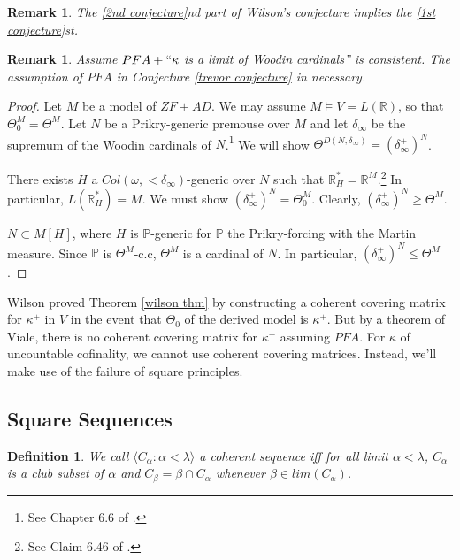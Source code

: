 \documentclass[12pt]{article}
\newtheorem{definition}[theorem]{Definition}
\newtheorem{remark}[theorem]{Remark}
\newcommand\R{\mathbb{R}}
\renewcommand\P{\mathbb{P}}
\begin{document}
\begin{remark}
    The \ref{2nd conjecture}nd part of Wilson's conjecture implies the \ref{1st conjecture}st.
\end{remark}

\begin{remark}
    Assume $PFA + ``\kappa$ is a limit of Woodin cardinals'' is consistent. The assumption of $PFA$ in Conjecture \ref{trevor conjecture} in necessary.
\end{remark}
\begin{proof}
    Let $M$ be a model of $ZF + AD$. We may assume $M\models V = L(\R)$, so that $\Theta_0^M = \Theta^M$. Let $N$ be a Prikry-generic premouse over $M$ and let $\delta_\infty$ be the supremum of the Woodin cardinals of $N$.\footnote{See Chapter 6.6 of \cite{hacm}.} We will show $\Theta^{D(N,\delta_\infty)} = (\delta_\infty^+)^N$.

    There exists $H$ a $Col(\omega,<\delta_\infty)$-generic over $N$ such that $\R^*_H = \R^M$.\footnote{See Claim 6.46 of \cite{hacm}.} In particular, $L(\R^*_H) = M$. We must show $(\delta_\infty^+)^N = \Theta_0^M$. Clearly, $(\delta_\infty^+)^N \geq \Theta^M$.
    
    $N\subset M[H]$, where $H$ is $\P$-generic for $\P$ the Prikry-forcing with the Martin measure. Since $\P$ is $\Theta^M$-c.c, $\Theta^M$ is a cardinal of $N$. In particular, $(\delta_\infty^+)^N \leq \Theta^M$.
\end{proof}

Wilson proved Theorem \ref{wilson thm} by constructing a coherent covering matrix for $\kappa^+$ in $V$ in the event that $\Theta_0$ of the derived model is $\kappa^+$. But by a theorem of Viale, there is no coherent covering matrix for $\kappa^+$ assuming $PFA$. For $\kappa$ of uncountable cofinality, we cannot use coherent covering matrices. Instead, we'll make use of the failure of square principles. 

\subsection{Square Sequences}

\begin{definition}
    We call $\langle C_\alpha : \alpha < \lambda\rangle$ a coherent sequence iff for all limit $\alpha< \lambda$, $C_\alpha$ is a club subset of $\alpha$ and $C_\beta = \beta \cap C_\alpha$ whenever $\beta \in lim(C_\alpha)$.
\end{definition}
\end{document}
